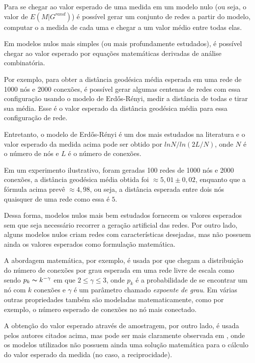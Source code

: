 \documentclass[12pt,a4paper,final]{article}
\begin{document}
Para se chegar ao valor esperado de uma medida em um modelo nulo (ou seja, o valor de $E(M|G^\textit{rand})$) é possível gerar um conjunto de redes a partir do modelo, computar o a medida de cada uma e chegar a um valor médio entre todas elas.

Em modelos nulos mais simples (ou mais profundamente estudados), é possível chegar ao valor esperado por equações matemáticas derivadas de análise combinatória.

Por exemplo, para obter a distância geodésica média esperada em uma rede de 1000 nós e 2000 conexões, é possível gerar algumas centenas de redes com essa configuração usando o modelo de Erdős-Rényi, medir a distância de todas e tirar sua média. Esse é o valor esperado da distância geodésica média para essa configuração de rede.

Entretanto, o modelo de Erdős-Rényi é um dos mais estudados na literatura e o valor esperado da medida acima pode ser obtido por $ln N / ln (2L / N)$, onde $N$ é o número de nós e $L$ é o número de conexões.

Em um experimento ilustrativo, foram geradas 100 redes de 1000 nós e 2000 conexões, a distância geodésica média obtida foi $\approx 5,01 \pm 0,02$, enquanto que a fórmula acima prevê $\approx 4,98$, ou seja, a distância esperada entre dois nós quaisquer de uma rede como essa é $5$.

Dessa forma, modelos nulos mais bem estudados fornecem os valores esperados sem que seja necessário recorrer a geração artificial das redes. Por outro lado, alguns modelos nulos criam redes com características desejadas, mas não possuem ainda os valores esperados como formulação matemática.

A abordagem matemática, por exemplo, é usada por  que chegam a distribuição do número de conexões por grau esperada em uma rede livre de escala como sendo $p_k \thicksim k^{-\gamma}$ em que $2 \leq \gamma \leq 3$, onde $p_k$ é a probabilidade de se encontrar um nó com $k$ conexões e $\gamma$ é um parâmetro chamado \textit{expoente de grau}. Em  várias outras propriedades também são modeladas matematicamente, como por exemplo, o número esperado de conexões no nó mais conectado.

A obtenção do valor esperado através de amostragem, por outro lado, é usada pelos autores citados acima, mas pode ser mais claramente observada em , onde os modelos utilizados não possuem ainda uma solução matemática para o cálculo do valor esperado da medida (no caso, a reciprocidade).
\end{document}
